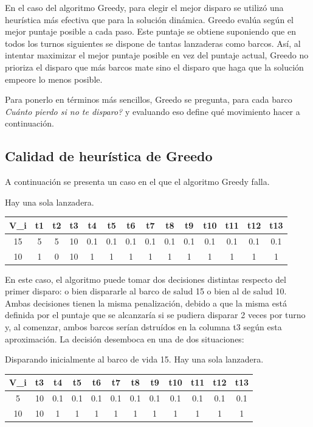 \documentclass{article}
\begin{document}
En el caso del algoritmo Greedy, para elegir el mejor disparo se utilizó una heurística más efectiva que para la solución dinámica. Greedo evalúa según el mejor puntaje posible a cada paso. Este puntaje se obtiene suponiendo que en todos los turnos siguientes se dispone de tantas lanzaderas como barcos. Así, al intentar maximizar el mejor puntaje posible en vez del puntaje actual, Greedo no prioriza el disparo que más barcos mate sino el disparo que haga que la solución empeore lo menos posible.

Para ponerlo en términos más sencillos, Greedo se pregunta, para cada barco \textit{Cuánto pierdo si no te disparo?} y evaluando eso define qué movimiento hacer a continuación.

\subsection{Calidad de heurística de Greedo}
A continuación se presenta un caso en el que el algoritmo Greedy falla.

Hay una sola lanzadera. \\
\begin{center}
\begin{tabular}{ c | c c c c c c c c c c c c c}
\hline
V\_i & t1 & t2 & t3 & t4 & t5 & t6 & t7 & t8 & t9 & t10 & t11 & t12 & t13 \\
\hline
15    &  5 &  5 &  10 &  0.1 &  0.1 &  0.1 & 0.1 &  0.1 &  0.1 &  0.1 &  0.1 & 0.1  & 0.1 \\
10    &  1 &  0 &  10 &  1 &  1 &  1 & 1 &  1 &  1 &  1 &  1 & 1  & 1
\end{tabular}
\end{center}

En este caso, el algoritmo puede tomar dos decisiones distintas respecto del primer disparo: o bien dispararle al barco de salud 15 o bien al de salud 10. Ambas decisiones tienen la misma penalización, debido a que la misma está definida por el puntaje que se alcanzaría si se pudiera disparar 2 veces por turno y, al comenzar, ambos barcos serían dstruídos en la columna t3 según esta aproximación. La decisión desemboca en una de dos situaciones:

Disparando inicialmente al barco de vida 15. Hay una sola lanzadera. \\
\begin{center}
\begin{tabular}{ c | c c c c c c c c c c c}
\hline
V\_i &   t3 & t4 & t5 & t6 & t7 & t8 & t9 & t10 & t11 & t12 & t13 \\
\hline
5     &  10 &  0.1 &  0.1 &  0.1 & 0.1 &  0.1 &  0.1 &  0.1 &  0.1 & 0.1  & 0.1 \\
10    &  10 &  1 &  1 &  1 & 1 &  1 &  1 &  1 &  1 & 1  & 1
\end{tabular}
\end{center}
\end{document}
